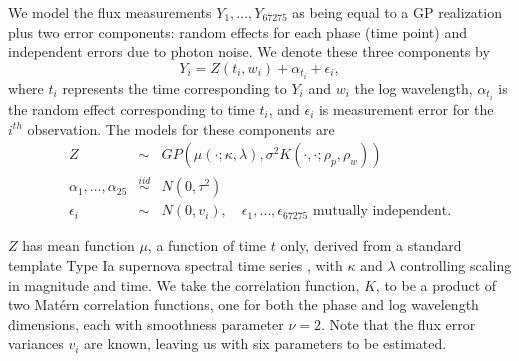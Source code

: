 \documentclass[12pt]{article}
\begin{document}
We model the flux measurements $Y_1, \ldots, Y_{67275}$ as being equal to a GP realization plus two error components: random effects for each phase (time point) and independent errors due to photon noise. We denote these three components by
$$Y_i = Z(t_i, w_i) + \alpha_{t_i} + \epsilon_{i},$$
where $t_i$ represents the time corresponding to $Y_i$ and $w_i$ the log wavelength, $\alpha_{t_i}$ is the random effect corresponding to time $t_i$, and $\epsilon_i$ is measurement error for the $i^{th}$ observation. The models for these components are
\begin{eqnarray*}
Z &\sim& GP(\mu(\cdot; \kappa, \lambda), \sigma^2 K(\cdot, \cdot; \rho_p, \rho_w))\\
\alpha_1, \ldots, \alpha_{25} &\stackrel{iid}{\sim}& N(0, \tau^2)\\
\epsilon_i &\sim& N(0, v_i), \quad \epsilon_1, \ldots, \epsilon_{67275} \mbox{ mutually independent.}
\end{eqnarray*}

$Z$ has mean function $\mu$, a function of time $t$ only, derived from a standard template Type Ia supernova spectral time series \citep{hsiao2007}, with $\kappa$ and $\lambda$ controlling scaling in magnitude and time. We take the correlation function, $K$, to be a product of two Mat\'ern correlation functions, one for both the phase and log wavelength dimensions, each with smoothness parameter $\nu=2$.  Note that the flux error variances $v_i$ are known, leaving us with six parameters to be estimated.
\end{document}
